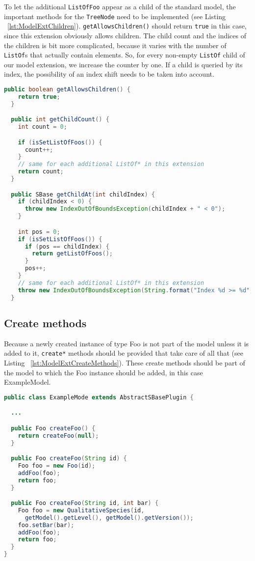 To let the additional \texttt{ListOfFoo} appear as a child of the standard model, the important methods for the \texttt{TreeNode} need to be implemented (see Listing ~\vref{lst:ModelExtChildren}).
\texttt{getAllowsChildren()} should return \texttt{true} in this case, since this extension obviously allows children.
The child count and the indices of the children is bit more complicated, because it varies with the number of \texttt{ListOf}s that actually contain elements.
So, for every non-empty \texttt{ListOf} child of our model extension, we increase the counter by one.
If a child is queried by its index, the possibility of an index shift needs to be taken into account.

\begin{lstlisting}[language=Java,caption={Methods which need to be implemented to make the children available in the extended model},label={lst:ModelExtChildren}]
  public boolean getAllowsChildren() {
    return true;
  }

  public int getChildCount() {
    int count = 0;

    if (isSetListOfFoos()) {
      count++;
    }
    // same for each additional ListOf* in this extension
    return count;
  }

  public SBase getChildAt(int childIndex) {
    if (childIndex < 0) {
      throw new IndexOutOfBoundsException(childIndex + " < 0");
    }

    int pos = 0;
    if (isSetListOfFoos()) {
      if (pos == childIndex) {
        return getListOfFoos();
      }
      pos++;
    }
    // same for each additional ListOf* in this extension
    throw new IndexOutOfBoundsException(String.format("Index %d >= %d", childIndex, +((int) Math.min(pos, 0))));
  }
\end{lstlisting}



\subsection{Create methods}

Because a newly created instance of type Foo is not part of the model unless it is added to it,
\texttt{create*} methods should be provided that take care of all that (see Listing ~\vref{lst:ModelExtCreateMethods}). 
These create methods should be part of the model to which the Foo instance should be added, in this case ExampleModel.

\begin{lstlisting}[language=Java,caption={Convenience method to retrieve the extended model},label={lst:ModelExtCreateMethods}]
public class ExampleMode extends AbstractSBasePlugin {

  ...

  public Foo createFoo() {
    return createFoo(null);
  }

  public Foo createFoo(String id) {
    Foo foo = new Foo(id);
    addFoo(foo);
    return foo;
  }

  public Foo createFoo(String id, int bar) {
    Foo foo = new QualitativeSpecies(id,
      getModel().getLevel(), getModel().getVersion());
    foo.setBar(bar);
    addFoo(foo);
    return foo;
  }
}
\end{lstlisting}


